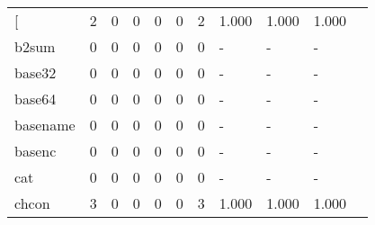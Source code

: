 \begin{longtable}{lp{1.10cm}p{1.10cm}p{1.10cm}p{1.10cm}p{1.10cm}p{1.10cm}p{1.10cm}p{1.10cm}p{1.10cm}p{1.10cm}}
\bottomrule
\endlastfoot
{[}         &                      2 &                                  0 &                                 0 &                                0 &                                 0 &                               2 &                          1.000 &                                 1.000 &                               1.000 \\
b2sum     &                      0 &                                  0 &                                 0 &                                0 &                                 0 &                               0 &                              - &                                     - &                                   - \\
base32    &                      0 &                                  0 &                                 0 &                                0 &                                 0 &                               0 &                              - &                                     - &                                   - \\
base64    &                      0 &                                  0 &                                 0 &                                0 &                                 0 &                               0 &                              - &                                     - &                                   - \\
basename  &                      0 &                                  0 &                                 0 &                                0 &                                 0 &                               0 &                              - &                                     - &                                   - \\
basenc    &                      0 &                                  0 &                                 0 &                                0 &                                 0 &                               0 &                              - &                                     - &                                   - \\
cat       &                      0 &                                  0 &                                 0 &                                0 &                                 0 &                               0 &                              - &                                     - &                                   - \\
chcon     &                      3 &                                  0 &                                 0 &                                0 &                                 0 &                               3 &                          1.000 &                                 1.000 &                               1.000 \\

\end{longtable}
